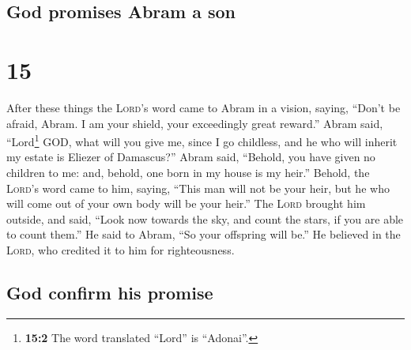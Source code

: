 \hypertarget{god-promises-abram-a-son}{%
\subsection{God promises Abram a son}\label{god-promises-abram-a-son}}

\hypertarget{section-14}{%
\section{15}\label{section-14}}

 After these things the \textsc{Lord}'s word came to Abram
in a vision, saying, ``Don't be afraid, Abram. I am your shield, your
exceedingly great reward.''  Abram said, ``Lord\footnote{\textbf{15:2}
  The word translated ``Lord'' is ``Adonai''.} GOD, what will you give
me, since I go childless, and he who will inherit my estate is Eliezer
of Damascus?''  Abram said, ``Behold, you have given no
children to me: and, behold, one born in my house is my heir.''
 Behold, the \textsc{Lord}'s word came to him, saying,
``This man will not be your heir, but he who will come out of your own
body will be your heir.''  The \textsc{Lord} brought him
outside, and said, ``Look now towards the sky, and count the stars, if
you are able to count them.'' He said to Abram, ``So your offspring will
be.''  He believed in the \textsc{Lord}, who credited it
to him for righteousness.

\hypertarget{god-confirm-his-promise}{%
\subsection{God confirm his promise}\label{god-confirm-his-promise}}

